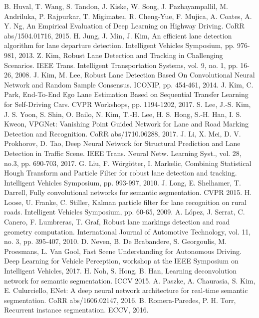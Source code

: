 \documentclass[letterpaper, 10 pt, conference]{ieeeconf}
\begin{document}
\begin{thebibliography}{99}
 B. Huval, T. Wang, S. Tandon, J. Kiske, W. Song, J. Pazhayampallil, M. Andriluka, P. Rajpurkar, T. Migimatsu, R. Cheng-Yue, F. Mujica, A. Coates, A. Y. Ng, An Empirical Evaluation of Deep Learning on Highway Driving. CoRR abs/1504.01716, 2015.
 H. Jung, J. Min, J. Kim, An efficient lane detection algorithm for lane departure detection. Intelligent Vehicles Symposium, pp. 976-981, 2013.
 Z. Kim, Robust Lane Detection and Tracking in Challenging Scenarios. IEEE Trans. Intelligent Transportation Systems, vol. 9, no. 1, pp. 16-26, 2008.
 J. Kim, M. Lee, Robust Lane Detection Based On Convolutional Neural Network and Random Sample Consensus. ICONIP, pp. 454-461, 2014.
 J. Kim, C. Park, End-To-End Ego Lane Estimation Based on Sequential Transfer Learning for Self-Driving Cars. CVPR Workshops, pp. 1194-1202, 2017.
 S. Lee, J.-S. Kim, J. S. Yoon, S. Shin, O. Bailo, N. Kim, T.-H. Lee, H. S. Hong, S.-H. Han, I. S. Kweon, VPGNet: Vanishing Point Guided Network for Lane and Road Marking Detection and Recognition. CoRR abs/1710.06288, 2017.
 J. Li, X. Mei, D. V. Prokhorov, D. Tao, Deep Neural Network for Structural Prediction and Lane Detection in Traffic Scene. IEEE Trans. Neural Netw. Learning Syst., vol. 28, no.3, pp. 690-703, 2017.
 G. Liu, F. W{\"o}rg{\"o}tter, I. Markelic, Combining Statistical Hough Transform and Particle Filter for robust lane detection and tracking. Intelligent Vehicles Symposium, pp. 993-997, 2010.
 J. Long, E. Shelhamer, T. Darrell, Fully convolutional networks for semantic segmentation. CVPR 2015.
 H. Loose, U. Franke, C. Stiller, Kalman particle filter for lane recognition on rural roads. Intelligent Vehicles Symposium, pp. 60-65, 2009.
 A. L{\'o}pez, J. Serrat, C. Canero, F. Lumbreras, T. Graf, Robust lane markings detection and road geometry computation. International Journal of Automotive Technology, vol. 11, no. 3, pp. 395-407, 2010.
 D. Neven, B. De Brabandere, S. Georgoulis, M. Proesmans, L. Van Gool, Fast Scene Understanding for Autonomous Driving. Deep Learning for Vehicle Perception, workshop at the IEEE Symposium on Intelligent Vehicles, 2017.
 H. Noh, S. Hong, B. Han, Learning deconvolution network for semantic segmentation. ICCV 2015.
 A. Paszke, A. Chaurasia, S. Kim, E. Culurciello, ENet: A deep neural network architecture for real-time semantic segmentation. CoRR abs/1606.02147, 2016.
 B. Romera-Paredes, P. H. Torr, Recurrent instance segmentation. ECCV, 2016.

\end{thebibliography}
\end{document}
